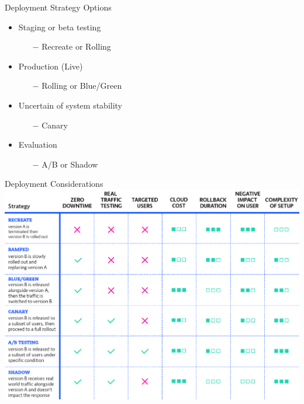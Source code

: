 \documentclass{slide}
\begin{document}
\begin{frame}{Deployment Strategy Options}
  \vspace{1pt}
  {\huge
    \begin{itemize}
        \item Staging or beta testing
        \begin{itemize}
            \LARGE\item[$-$] Recreate or Rolling
        \end{itemize}
        \vspace{1mm}
        \item Production (Live)
        \begin{itemize}
            \LARGE\item[$-$] Rolling or Blue/Green
        \end{itemize}
        \vspace{1mm}
        \item Uncertain of system stability
        \begin{itemize}
            \LARGE\item[$-$] Canary
        \end{itemize}
        \vspace{1mm}
        \item Evaluation
        \begin{itemize}
            \LARGE\item[$-$] A/B or Shadow
        \end{itemize}
    \end{itemize}
  }
\end{frame}

\begin{frame}{Deployment Considerations \cite{deployment-strategies}}
    \centering
    \includegraphics[height=0.92\textheight]{diagrams/deployment_strategies.png}
\end{frame}
\end{document}
